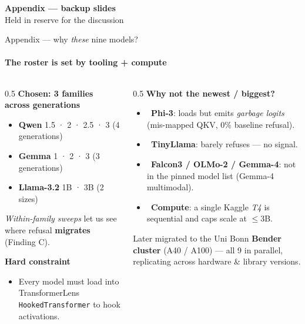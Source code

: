 \documentclass[aspectratio=169]{beamer}
\newcommand{\bad}{\textcolor{red!70!black}{\ding{55}}}
\newcommand{\hl}[1]{\textcolor{themeblue}{\textbf{#1}}}
\newcommand{\hlo}[1]{\textcolor{themeorange!75!black}{\textbf{#1}}}
\begin{document}
\begin{frame}[plain]
  \centering
  \vspace{1.4cm}
  {\Large\bfseries \textcolor{themeblue}{Appendix — backup slides}}\\[8pt]
  {\footnotesize Held in reserve for the discussion}
\end{frame}

\begin{frame}{Appendix --- why \emph{these} nine models?}
  \framesubtitle{The roster is set by tooling + compute}
  \begin{columns}[T]
    \begin{column}{0.5\textwidth}
      \textbf{Chosen: 3 families across generations}
      \begin{itemize}\footnotesize
        \item \hlo{Qwen} 1.5 · 2 · 2.5 · 3 \quad(4 generations)
        \item \hlo{Gemma} 1 · 2 · 3 \quad(3 generations)
        \item \hlo{Llama-3.2} 1B · 3B \quad(2 sizes)
      \end{itemize}
      \vspace{2pt}
      {\footnotesize \emph{Within-family sweeps} let us see where refusal \hl{migrates} (Finding C).}
      \vspace{6pt}

      \textbf{Hard constraint}
      \begin{itemize}\footnotesize
        \item Every model must load into TransformerLens \texttt{HookedTransformer} to hook activations.
      \end{itemize}
    \end{column}
    \begin{column}{0.5\textwidth}
      \textbf{Why not the newest / biggest?}
      \begin{itemize}\footnotesize
        \item \bad\ \hl{Phi-3}: loads but emits \emph{garbage logits} (mis-mapped QKV, 0\% baseline refusal).
        \item \bad\ \hl{TinyLlama}: barely refuses --- no signal.
        \item \bad\ \hl{Falcon3 / OLMo-2 / Gemma-4}: not in the pinned model list (Gemma-4 multimodal).
        \item \bad\ \hl{Compute}: a single Kaggle \emph{T4} is sequential and caps scale at $\le$3B.
      \end{itemize}
      \vspace{3pt}
      \begin{block}{}
        \footnotesize Later migrated to the Uni Bonn \hl{Bender cluster} (A40 / A100) --- all 9 in parallel, replicating across hardware \& library versions.
      \end{block}
    \end{column}
  \end{columns}
\end{frame}
\end{document}
